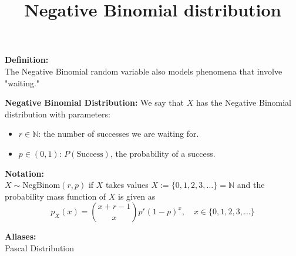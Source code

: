 \documentclass{article}
\title{Negative Binomial distribution}
\begin{document}
\maketitle

\textbf{Definition:} \\
The Negative Binomial random variable also models phenomena that involve "waiting."

\textbf{Negative Binomial Distribution:} We say that \( X \) has the Negative Binomial distribution with parameters:
\begin{itemize}
    \item \( r \in \mathbb{N} \): the number of successes we are waiting for.
    \item \( p \in (0, 1) \): \( P(\text{Success}) \), the probability of a success.
\end{itemize}

\textbf{Notation:} \\
\( X \sim \text{NegBinom}(r, p) \) if \( X \) takes values \( X := \{0, 1, 2, 3, \ldots\} = \mathbb{N} \)
and the probability mass function of \( X \) is given as
\[
p_X(x) = \binom{x + r - 1}{x} p^r (1 - p)^x, \quad x \in \{0, 1, 2, 3, \ldots\}
\]

\textbf{Aliases:} \\
Pascal Distribution
\end{document}
